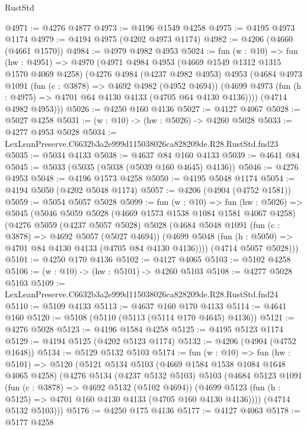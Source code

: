 \begin{lexlean}{RustStd}
\begin{coremodule}
@4971 := @4276 @4877
@4973 := @4196 @1549 @4258
@4975 := @4195 @4973 @1174
@4979 := @4194 @4975 (@4202 @4973 @1174)
@4982 := @4206 (@4660 (@4661 @1570))
@4984 := @4979 @4982 @4953
@5024 := fun (w : @10) =>
  fun (hw : @4951) =>
  @4970
    (@4971
      @4984
      @4953
      (@4669 @1549 @1312 @1315 @1570 @4069 @4258)
      (@4276
        @4984
        (@4237 @4982 @4953)
        @4953
        (@4684
          @4973
          @1091
          (fun (c : @3878) => @4692 @4982 (@4952 @4694))
          (@4699 @4973 (fun (h : @4975) => @4701 @64 @4130 @4133 (@4705 @64 @4130 @4136))))
        (@4714 @4982 @4953)))
@5026 := @4250 @160 @4136
@5027 := @4127 @4067
@5028 := @5027 @4258
@5031 := (w : @10) -> (hw : @5026) -> @4260 @5028
@5033 := @4277 @4953 @5028
@5034 := LexLeanPreserve.C6632b3a2e999d115038026ca828209de.R28.RustStd.fnd23
@5035 := @5034 @4133
@5038 := @4637 @84 @160 @4133
@5039 := @4641 @84
@5045 := @5033 (@5035 (@5038 (@5039 @160 @4645) @4136))
@5046 := @4276 @4953
@5048 := @4196 @1573 @4258
@5050 := @4195 @5048 @1174
@5054 := @4194 @5050 (@4202 @5048 @1174)
@5057 := @4206 (@4904 (@4752 @1581))
@5059 := @5054 @5057 @5028
@5099 := fun (w : @10) =>
  fun (hw : @5026) =>
  @5045
    (@5046
      @5059
      @5028
      (@4669 @1573 @1538 @1084 @1581 @4067 @4258)
      (@4276
        @5059
        (@4237 @5057 @5028)
        @5028
        (@4684
          @5048
          @1091
          (fun (c : @3878) => @4692 @5057 (@5027 @4694))
          (@4699 @5048 (fun (h : @5050) => @4701 @84 @4130 @4133 (@4705 @84 @4130 @4136))))
        (@4714 @5057 @5028)))
@5101 := @4250 @170 @4136
@5102 := @4127 @4065
@5103 := @5102 @4258
@5106 := (w : @10) -> (hw : @5101) -> @4260 @5103
@5108 := @4277 @5028 @5103
@5109 := LexLeanPreserve.C6632b3a2e999d115038026ca828209de.R28.RustStd.fnd24
@5110 := @5109 @4133
@5113 := @4637 @160 @170 @4133
@5114 := @4641 @160
@5120 := @5108 (@5110 (@5113 (@5114 @170 @4645) @4136))
@5121 := @4276 @5028
@5123 := @4196 @1584 @4258
@5125 := @4195 @5123 @1174
@5129 := @4194 @5125 (@4202 @5123 @1174)
@5132 := @4206 (@4904 (@4752 @1648))
@5134 := @5129 @5132 @5103
@5174 := fun (w : @10) =>
  fun (hw : @5101) =>
  @5120
    (@5121
      @5134
      @5103
      (@4669 @1584 @1538 @1084 @1648 @4065 @4258)
      (@4276
        @5134
        (@4237 @5132 @5103)
        @5103
        (@4684
          @5123
          @1091
          (fun (c : @3878) => @4692 @5132 (@5102 @4694))
          (@4699 @5123 (fun (h : @5125) => @4701 @160 @4130 @4133 (@4705 @160 @4130 @4136))))
        (@4714 @5132 @5103)))
@5176 := @4250 @175 @4136
@5177 := @4127 @4063
@5178 := @5177 @4258

\end{coremodule}
\end{lexlean}
